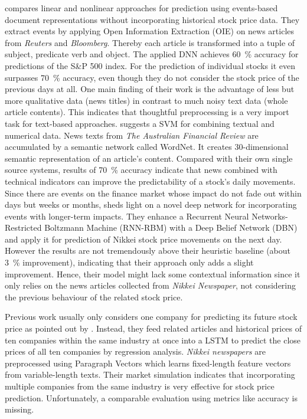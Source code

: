 \citet{Ding2014UsingInvestigation} compares linear and nonlinear approaches for prediction using events-based document representations without incorporating historical stock price data. They extract events by applying Open Information Extraction (OIE) on news articles from \textit{Reuters} and \textit{Bloomberg}. Thereby each article is transformed into a tuple of subject, predicate verb and object. The applied DNN achieves 60~\% accuracy for predictions of the S\&P 500 index. For the prediction of individual stocks it even surpasses 70~\% accuracy, even though they do not consider the stock price of the previous days at all. One main finding of their work is the advantage of less but more qualitative data (news titles) in contrast to much noisy text data (whole article contents). This indicates that thoughtful preprocessing is a very import task for text-based approaches. \citet{Zhai2007CombiningPrediction} suggests a SVM for combining textual and numerical data. News texts from \textit{The Australian Financial Review} are accumulated by a semantic network called WordNet. It creates 30-dimensional semantic representation of an article's content. Compared with their own single source systems, results of 70~\% accuracy indicate that news combined with technical indicators can improve the predictability of a stock's daily movements. Since there are events on the finance market whose impact do not fade out within days but weeks or months, \citet{Yoshihara2014PredictingNetworks} sheds light on a novel deep network for incorporating events with longer-term impacts. They enhance a Recurrent Neural Networks-Restricted Boltzmann Machine (RNN-RBM) with a Deep Belief Network (DBN) and apply it for prediction of Nikkei stock price movements on the next day. However the results are not tremendously above their heuristic baseline (about 3~\% improvement), indicating that their approach only adds a slight improvement. Hence, their model might lack some contextual information since it only relies on the news articles collected from \textit{Nikkei Newspaper}, not considering the previous behaviour of the related stock price.

Previous work usually only considers one company for predicting its future stock price as pointed out by \citet{Akita2016DeepInformation}. Instead, they feed related articles and historical prices of ten companies within the same industry at once into a LSTM to predict the close prices of all ten companies by regression analysis. \textit{Nikkei newspapers} are preprocessed using Paragraph Vectors which learns fixed-length feature vectors from variable-length texts. Their market simulation indicates that incorporating multiple companies from the same industry is very effective for stock price prediction. Unfortunately, a comparable evaluation using metrics like accuracy is missing.

